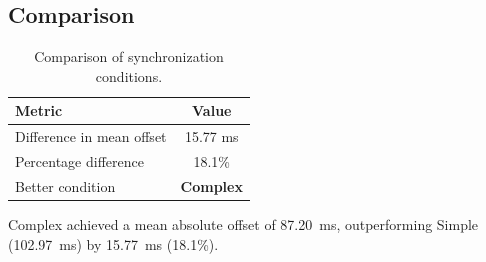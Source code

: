 \subsection*{Comparison}

\begin{table}[h!]
\centering
\begin{tabular}{|l|c|}
\hline
Metric & Value \\
\hline
Difference in mean offset & 15.77 ms \\
Percentage difference & 18.1\% \\
Better condition & \textbf{Complex} \\
\hline
\end{tabular}
\caption{Comparison of synchronization conditions.}
\label{tab:sync_comparison}
\end{table}

Complex achieved a mean absolute offset of 87.20~ms, outperforming Simple (102.97~ms) by 15.77~ms (18.1\%).
